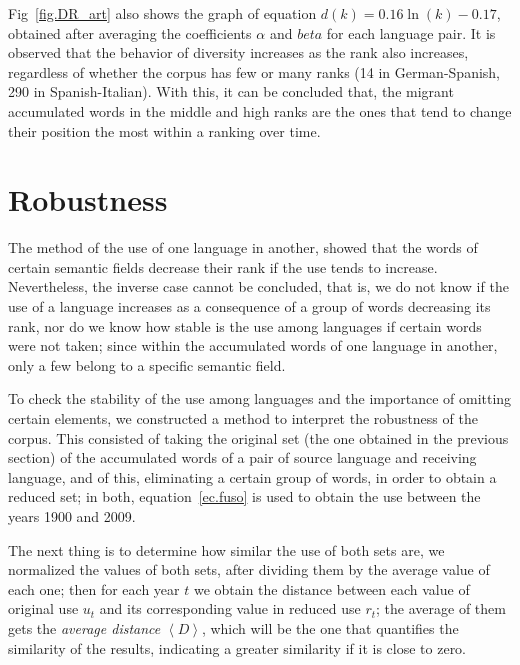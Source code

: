 \documentclass[10pt,letterpaper]{article} %
\begin{document}
	
	Fig~\ref{fig.DR_art} also shows the graph of equation $d(k) = 0.16\ln(k) - 0.17$, obtained after averaging the coefficients $\alpha$ and $beta$ for each language pair. It is observed that the behavior of diversity increases as the rank also increases, regardless of whether the corpus has few or many ranks (14 in German-Spanish, 290 in Spanish-Italian). With this, it can be concluded that, the migrant accumulated words in the middle and high ranks are the ones that tend to change their position the most within a ranking over time.
	
	
	
	\section*{Robustness} %
	
	The method of the use of one language in another, showed that the words of certain semantic fields decrease their rank if the use tends to increase. Nevertheless, the inverse case cannot be concluded, that is, we do not know if the use of a language increases as a consequence of a group of words decreasing its rank, nor do we know how stable is the use among languages if certain words were not taken; since within the accumulated words of one language in another, only a few belong to a specific semantic field.
	
	To check the stability of the use among languages and the importance of omitting certain elements, we constructed a method to interpret the robustness of the corpus. This consisted of taking the original set (the one obtained in the previous section) of the accumulated words of a pair of source language and receiving language, and of this, eliminating a certain group of words, in order to obtain a reduced set; in both,  equation~\ref{ec.fuso} is used to obtain the use between the years 1900 and 2009.
	
	The next thing is to determine how similar the use of both sets are, we normalized the values of both sets, after dividing them by the average value of each one; then for each year $t$ we obtain the distance between each value of original use $u_{t}$ and its corresponding value in reduced use $r_{t}$; the average of them gets the \textit{average distance} $\left\langle D \right\rangle$, which will be the one that quantifies the similarity of the results, indicating a greater similarity if it is close to zero.
	
\end{document}
